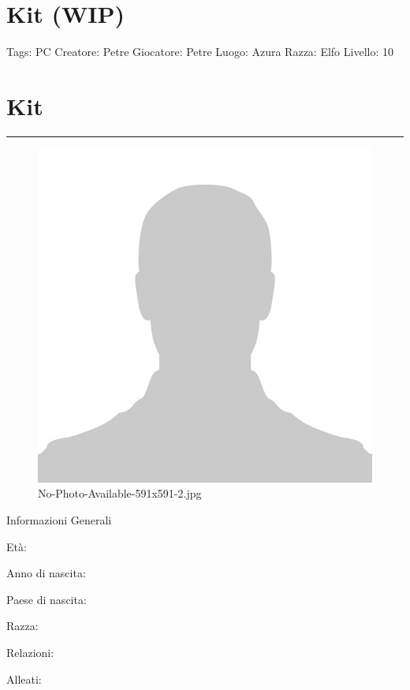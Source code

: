 \section{Kit (WIP)}\label{kit-wip}

Tags: PC Creatore: Petre Giocatore: Petre Luogo: Azura Razza: Elfo
Livello: 10

\section{Kit}\label{kit}

\begin{center}\rule{0.5\linewidth}{0.5pt}\end{center}

\begin{figure}
\centering
\includegraphics{No-Photo-Available-591x591-2.jpg}
\caption{No-Photo-Available-591x591-2.jpg}
\end{figure}

Informazioni Generali

Età:

Anno di nascita:

Paese di nascita:

Razza:

Relazioni:

Alleati:

